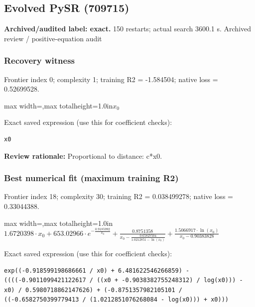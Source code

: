 \documentclass[10pt,letterpaper,landscape]{article}
\begin{document}
\begin{minipage}[t]{0.485\textwidth}
\subsection*{Evolved PySR (709715)}
\textbf{Archived/audited label: exact.} 150 restarts; actual search 3600.1 s.
{\small Archived review / positive-equation audit}
\subsubsection*{Recovery witness}
Frontier index 0; complexity 1; training R2 = -1.584504; native loss = 0.52699528.
\begin{center}\begin{adjustbox}{max width=\linewidth,max totalheight=1.0in}$\displaystyle x_{0}$\end{adjustbox}\end{center}
{\scriptsize Exact saved expression (use this for coefficient checks):}
\begin{lstlisting}
x0
\end{lstlisting}
{\small\textbf{Review rationale:} Proportional to distance: c*x0.}
\subsubsection*{Best numerical fit (maximum training R2)}
Frontier index 18; complexity 30; training R2 = 0.038499278; native loss = 0.33044388.
\begin{center}\begin{adjustbox}{max width=\linewidth,max totalheight=1.0in}$\displaystyle 1.6720398 \cdot x_{0} + 653.02966 \cdot e^{- \frac{0.9185992}{x_{0}}} + \frac{0.8751358}{x_{0} - \frac{0.65827504}{1.0212851 - \ln{\left(x_{0} \right)}}} + \frac{1.5066917 \cdot \ln{\left(x_{0} \right)}}{x_{0} - 0.90383828}$\end{adjustbox}\end{center}
{\scriptsize Exact saved expression (use this for coefficient checks):}
\begin{lstlisting}
exp((-0.918599198686661 / x0) + 6.481622546266859) - ((((-0.9011099421122617 / ((x0 + -0.9038382755248312) / log(x0))) - x0) / 0.5980718862147626) + (-0.8751357982105101 / ((-0.6582750399779413 / (1.0212851076268084 - log(x0))) + x0)))
\end{lstlisting}
\end{minipage}
\clearpage{}\label{hubble-10003}
\end{document}

